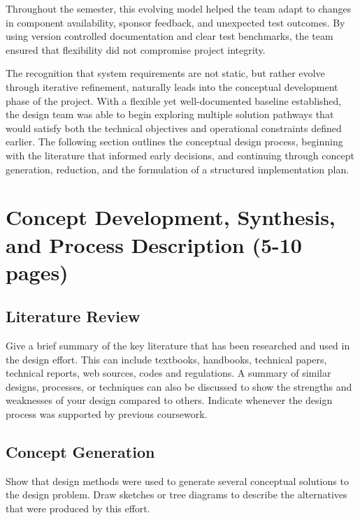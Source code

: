 \documentclass[12pt]{article}
\begin{document}
\par Throughout the semester, this evolving model helped the team adapt to changes in component availability, sponsor feedback, and unexpected test outcomes. By using version controlled documentation and clear test benchmarks, the team ensured that flexibility did not compromise project integrity.

\par The recognition that system requirements are not static, but rather evolve through iterative refinement, naturally leads into the conceptual development phase of the project. With a flexible yet well-documented baseline established, the design team was able to begin exploring multiple solution pathways that would satisfy both the technical objectives and operational constraints defined earlier. The following section outlines the conceptual design process, beginning with the literature that informed early decisions, and continuing through concept generation, reduction, and the formulation of a structured implementation plan.


\section{Concept Development, Synthesis, and Process Description (5-10 pages)}
\subsection{Literature Review}
Give a brief summary of the key literature that has been researched and used in the design effort. This can include textbooks, handbooks, technical papers, technical reports, web sources, codes and regulations. A summary of similar designs, processes, or techniques can also be discussed to show the strengths and weaknesses of your design compared to others. Indicate whenever the design process was supported by previous coursework.

\subsection{Concept Generation}
Show that design methods were used to generate several conceptual solutions to the design problem. Draw sketches or tree diagrams to describe the alternatives that were produced by this effort.
\end{document}

